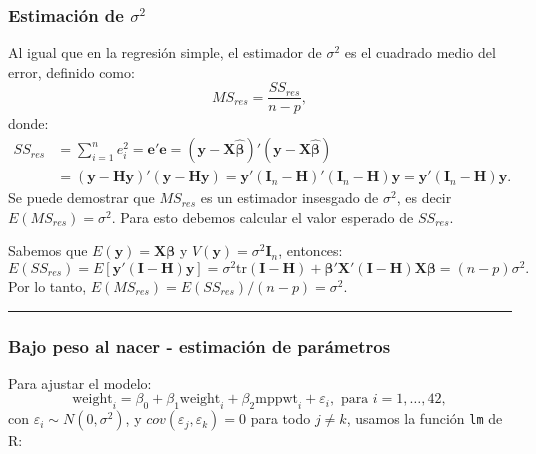 \documentclass[
]{article}
\begin{document}
\hypertarget{estimaciuxf3n-de-sigma2-1}{%
\subsubsection{\texorpdfstring{Estimación de \(\sigma^{2}\)}{Estimación de \textbackslash sigma\^{}\{2\}}}\label{estimaciuxf3n-de-sigma2-1}}

Al igual que en la regresión simple, el estimador de \(\sigma^{2}\) es el cuadrado medio del error, definido como:
\[
MS_{res} = \frac{SS_{res}}{n-p},
\]
donde:
\begin{equation}
\begin{split}
SS_{res} &= \sum_{i=1}^{n}e^{2}_{i} = \boldsymbol e'\boldsymbol e= (\boldsymbol y- \boldsymbol X\widehat{\boldsymbol \beta})'(\boldsymbol y- \boldsymbol X\widehat{\boldsymbol \beta}) \\
&= (\boldsymbol y- \boldsymbol H\boldsymbol y)'(\boldsymbol y- \boldsymbol H\boldsymbol y) = \boldsymbol y'(\boldsymbol I_{n}-\boldsymbol H)'(\boldsymbol I_{n}-\boldsymbol H)\boldsymbol y= \boldsymbol y'(\boldsymbol I_{n} - \boldsymbol H)\boldsymbol y.
\end{split}
\nonumber
\end{equation}
Se puede demostrar que \(MS_{res}\) es un estimador insesgado de \(\sigma^{2}\), es decir \(E(MS_{res})=\sigma^{2}\). Para esto debemos calcular el valor esperado de \(SS_{res}\).

Sabemos que \(E(\boldsymbol y) = \boldsymbol X\boldsymbol \beta\) y \(V(\boldsymbol y) = \sigma^{2}\boldsymbol I_{n}\), entonces:
\[
E(SS_{res}) = E\left[\boldsymbol y'(\boldsymbol I- \boldsymbol H)\boldsymbol y\right] = \sigma^{2}\mbox{tr}\left( \boldsymbol I- \boldsymbol H\right) + \boldsymbol \beta'\boldsymbol X'(\boldsymbol I- \boldsymbol H)\boldsymbol X\boldsymbol \beta= (n-p)\sigma^{2}.
\]
Por lo tanto, \(E(MS_{res}) = E(SS_{res})/(n-p) = \sigma^{2}\).

\rule{\textwidth}{0.4pt}

\hypertarget{bajo-peso-al-nacer---estimaciuxf3n-de-paruxe1metros}{%
\subsubsection{Bajo peso al nacer - estimación de parámetros}\label{bajo-peso-al-nacer---estimaciuxf3n-de-paruxe1metros}}

Para ajustar el modelo:
\[
\mbox{weight}_{i} = \beta_{0} + \beta_{1}\mbox{weight}_{i} + \beta_{2}\mbox{mppwt}_{i} + \varepsilon_{i}, \mbox{ para }i=1,\ldots,42,
\]
con \(\varepsilon_{i}\sim N(0,\sigma^{2})\), y \(cov(\varepsilon_{j},\varepsilon_{k})=0\) para todo \(j\neq k\), usamos la función \texttt{lm} de R:
\end{document}
